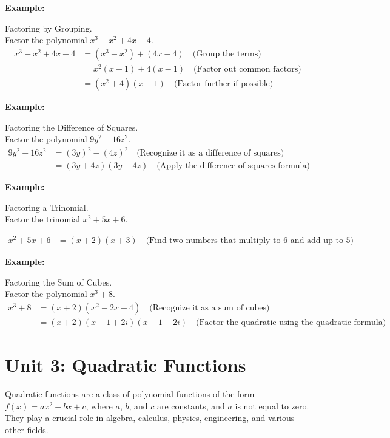 \documentclass[12pt,a4paper]{article}
\newenvironment{example}
  {\begin{framed}\colorbox{examplecolor}{
  \parbox{\dimexpr\linewidth-2\fboxsep}{
  \textbf{Example:}}}}
  {\end{framed}}
\begin{document}
\begin{example}
Factoring by Grouping.\\
Factor the polynomial $x^3 - x^2 + 4x - 4$.
\begin{align*}
x^3 - x^2 + 4x - 4 &= (x^3 - x^2) + (4x - 4) \quad \text{(Group the terms)} \\
&= x^2(x - 1) + 4(x - 1) \quad \text{(Factor out common factors)} \\
&= (x^2 + 4)(x - 1) \quad \text{(Factor further if possible)}
\end{align*}
\end{example}
\begin{example}
Factoring the Difference of Squares.\\
Factor the polynomial $9y^2 - 16z^2$.
\begin{align*}
9y^2 - 16z^2 &= (3y)^2 - (4z)^2 \quad \text{(Recognize it as a difference of squares)} \\
&= (3y + 4z)(3y - 4z) \quad \text{(Apply the difference of squares formula)}
\end{align*}
\end{example}
\begin{example}
Factoring a Trinomial.\\
Factor the trinomial $x^2 + 5x + 6$.

\begin{align*}
x^2 + 5x + 6 &= (x + 2)(x + 3) \quad \text{(Find two numbers that multiply to 6 and add up to 5)}
\end{align*}
\end{example}
\begin{example}
Factoring the Sum of Cubes.\\
Factor the polynomial $x^3 + 8$.
\begin{align*}
x^3 + 8 &= (x + 2)(x^2 - 2x + 4) \quad \text{(Recognize it as a sum of cubes)} \\
&= (x + 2)(x - 1 + 2i)(x - 1 - 2i) \quad \text{(Factor the quadratic using the quadratic formula)}
\end{align*}
\end{example}
\newpage 

\newpage
\section*{Unit 3: Quadratic Functions}
Quadratic functions are a class of polynomial functions of the form $f(x) = ax^2 + bx + c$, where $a$, $b$, and $c$ are constants, and $a$ is not equal to zero. They play a crucial role in algebra, calculus, physics, engineering, and various other fields. 
\end{document}
